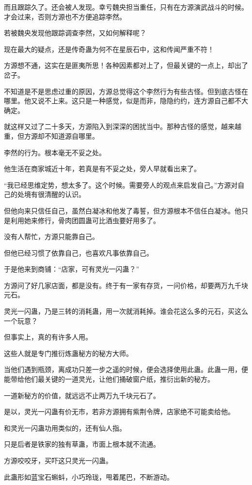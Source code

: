 \begin{this_body}
而且跟踪久了。还会被人发现。幸亏魏央担当重任，只有在方源演武战斗的时候。才会过来，否则方源也不方便追踪李然。

若被魏央发现他跟踪调查李然，又如何解释呢？

现在最大的疑点，还是传奇蛊为何不在星辰石中，这和传闻严重不符！

方源想不通，这实在是匪夷所思！各种因素都对上了，但最关键的一点上，却出了岔子。

不知道是不是思虑过重的原因，方源总觉得这个李然行为有些古怪。但到底古怪在哪里。他又说不上来。这只是一种感觉，似是而非，隐隐约约，连方源自己都不大确定。

就这样又过了二十多天，方源陷入到深深的困扰当中。那种古怪的感觉，越来越重，但方源却不知道源自哪里。

李然的行为。根本毫无不妥之处。

他生活在商家城近十年，若真是有不妥之处，旁人早就看出来了。

“我已经思维定势，想太多了。这个时候。需要旁人的观点来启发自己。”方源对自己的处境有很清醒的认识。

但他向来只信任自己，虽然白凝冰和他发了毒誓，但方源根本不信任白凝冰。他只是利用她来修行，骨肉团圆蛊可比酒虫要好用多了。

没有人帮忙，方源只能靠自己。

但他已经习惯了依靠自己，也喜欢凡事依靠自己。

于是他来到商铺：“店家，可有灵光一闪蛊？”

方源问了好几家店面，都是没有。终于有一家有存货，一问价格，却要两万九千块元石。

灵光一闪蛊，乃是三转的消耗蛊，用一次就消耗掉。谁会花这么多的元石，买这么一个玩意？

但事实上，真的有许多人用。

这些人就是专门推衍炼蛊秘方的秘方大师。

当他们遇到瓶颈，离成功只差一步之遥的时候，便会选择使用此蛊。此蛊一用，便能带给他们最关键的一道灵光，让他们捅破窗户纸，推衍出新的秘方。

一道新秘方的价值，就远远不止两万九千块元石了。

是以，灵光一闪蛊有价无市，若非方源拥有紫荆令牌，店家绝不可能卖给他。

和灵光一闪蛊功用类似的，还有仙人指。

只是后者是铁家的独有草蛊，市面上根本就不流通。

方源咬咬牙，买吓这只灵光一闪蛊。

此蛊形如蓝宝石蝌蚪，小巧玲珑，甩着尾巴，不断游动。


\end{this_body}

